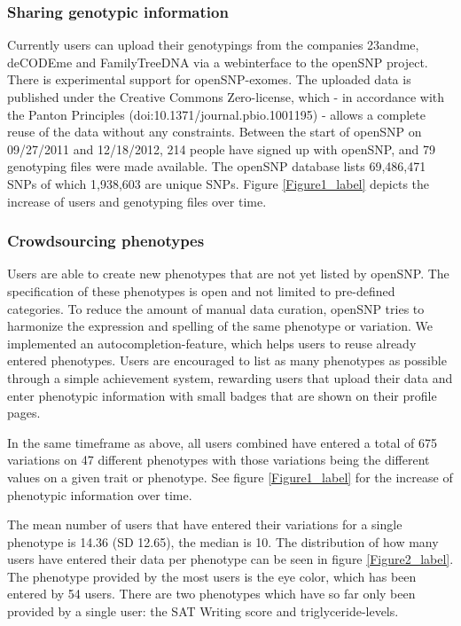 \documentclass[10pt]{article}
\begin{document}
\subsubsection*{Sharing genotypic information}
Currently users can upload their genotypings from the companies 23andme, deCODEme and FamilyTreeDNA via a webinterface to the openSNP 
project. There is experimental support for openSNP-exomes. The uploaded data is published under the Creative Commons Zero-license, 
which - in accordance with the Panton Principles (doi:10.1371/journal.pbio.1001195) - 
allows a complete reuse of the data without any constraints.
Between the start of openSNP on 09/27/2011 and 12/18/2012, 214 people have signed 
up with openSNP, and 79 genotyping files were made available. The openSNP 
database lists 69,486,471 SNPs of which 1,938,603 are unique SNPs.
Figure \ref{Figure1_label} depicts the increase of users and genotyping files over time.


\subsubsection*{Crowdsourcing phenotypes}
Users are able to create new phenotypes that are not yet 
listed by openSNP. 
The specification of these phenotypes is open and not limited 
to pre-defined categories. To reduce the amount of manual data curation, openSNP tries to harmonize 
the expression and spelling of the same phenotype or variation. We implemented an 
autocompletion-feature, which helps users to reuse already entered phenotypes.
Users are encouraged to list as many phenotypes as possible through a simple 
achievement system, rewarding users that upload their data and enter phenotypic 
information with small badges that are shown on their profile pages.

In the same timeframe as above, all users combined have 
entered a total of 675 variations on 47 different phenotypes with those variations being 
the different values on a given trait or phenotype. See figure \ref{Figure1_label} for the increase of phenotypic information over time.

The mean number of users that have entered their variations for a single phenotype 
is 14.36 (SD 12.65), the median is 10. The distribution of how many users have 
entered their data per phenotype can be seen in figure \ref{Figure2_label}. The phenotype provided 
by the most users is the eye color, which has been entered by 54 users. There are 
two phenotypes which have so far only been provided by a single user: 
the SAT Writing score and triglyceride-levels.
\end{document}
